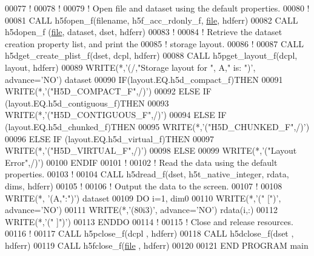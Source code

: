 \begin{DoxyCode}
00077   \textcolor{comment}{!}
00078   \textcolor{comment}{!}
00079   \textcolor{comment}{! Open file and dataset using the default properties.}
00080   \textcolor{comment}{!}
00081   \textcolor{keyword}{CALL }h5fopen\_f(filename, h5f\_acc\_rdonly\_f, \hyperlink{structfile}{file}, hdferr)
00082   \textcolor{keyword}{CALL }h5dopen\_f (\hyperlink{structfile}{file}, dataset, dset, hdferr)
00083   \textcolor{comment}{!}
00084   \textcolor{comment}{! Retrieve the dataset creation property list, and print the}
00085   \textcolor{comment}{! storage layout.}
00086   \textcolor{comment}{!}
00087   \textcolor{keyword}{CALL }h5dget\_create\_plist\_f(dset, dcpl, hdferr)
00088   \textcolor{keyword}{CALL }h5pget\_layout\_f(dcpl, layout, hdferr)
00089   \textcolor{keyword}{WRITE}(*,\textcolor{stringliteral}{'(/,"Storage layout for ", A," is: ")'}, advance=\textcolor{stringliteral}{'NO'}) dataset
00090   \textcolor{keywordflow}{IF}(layout.EQ.h5d\_compact\_f)\textcolor{keywordflow}{THEN}
00091      \textcolor{keyword}{WRITE}(*,\textcolor{stringliteral}{'("H5D\_COMPACT\_F",/)'})
00092   \textcolor{keywordflow}{ELSE} \textcolor{keywordflow}{IF} (layout.EQ.h5d\_contiguous\_f)\textcolor{keywordflow}{THEN}
00093      \textcolor{keyword}{WRITE}(*,\textcolor{stringliteral}{'("H5D\_CONTIGUOUS\_F",/)'})
00094   \textcolor{keywordflow}{ELSE} \textcolor{keywordflow}{IF} (layout.EQ.h5d\_chunked\_f)\textcolor{keywordflow}{THEN}
00095      \textcolor{keyword}{WRITE}(*,\textcolor{stringliteral}{'("H5D\_CHUNKED\_F",/)'})
00096   \textcolor{keywordflow}{ELSE} \textcolor{keywordflow}{IF} (layout.EQ.h5d\_virtual\_f)\textcolor{keywordflow}{THEN}
00097      \textcolor{keyword}{WRITE}(*,\textcolor{stringliteral}{'("H5D\_VIRTUAL\_F",/)'})
00098   \textcolor{keywordflow}{ELSE}
00099      \textcolor{keyword}{WRITE}(*,\textcolor{stringliteral}{'("Layout Error",/)'})
00100 \textcolor{keywordflow}{  ENDIF}
00101   \textcolor{comment}{!}
00102   \textcolor{comment}{! Read the data using the default properties.}
00103   \textcolor{comment}{!}
00104   \textcolor{keyword}{CALL }h5dread\_f(dset, h5t\_native\_integer, rdata, dims, hdferr)
00105   \textcolor{comment}{!}
00106   \textcolor{comment}{! Output the data to the screen.}
00107   \textcolor{comment}{!}
00108   \textcolor{keyword}{WRITE}(*, \textcolor{stringliteral}{'(A,":")'}) dataset
00109   \textcolor{keywordflow}{DO} i=1, dim0
00110      \textcolor{keyword}{WRITE}(*,\textcolor{stringliteral}{'(" [")'}, advance=\textcolor{stringliteral}{'NO'})
00111      \textcolor{keyword}{WRITE}(*,\textcolor{stringliteral}{'(80i3)'}, advance=\textcolor{stringliteral}{'NO'}) rdata(i,:)
00112      \textcolor{keyword}{WRITE}(*,\textcolor{stringliteral}{'(" ]")'})
00113 \textcolor{keywordflow}{  ENDDO}
00114   \textcolor{comment}{!}
00115   \textcolor{comment}{! Close and release resources.}
00116   \textcolor{comment}{!}
00117   \textcolor{keyword}{CALL }h5pclose\_f(dcpl , hdferr)
00118   \textcolor{keyword}{CALL }h5dclose\_f(dset , hdferr)
00119   \textcolor{keyword}{CALL }h5fclose\_f(\hyperlink{structfile}{file} , hdferr)
00120 
00121 \textcolor{keyword}{END PROGRAM }main
\end{DoxyCode}

